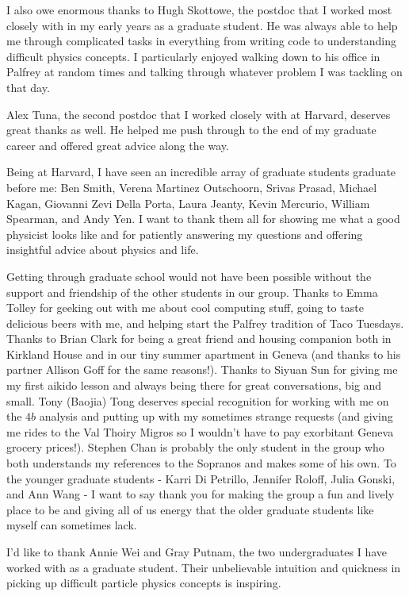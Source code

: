 \begin{doublespace}
I also owe enormous thanks to Hugh Skottowe, the postdoc that I worked most closely with in my early years as a graduate student. He was always able to help me through complicated tasks in everything from writing code to understanding difficult physics concepts. I particularly enjoyed walking down to his office in Palfrey at random times and talking through whatever problem I was tackling on that day. 

Alex Tuna, the second postdoc that I worked closely with at Harvard, deserves great thanks as well. He helped me push through to the end of my graduate career and offered great advice along the way. 

Being at Harvard, I have seen an incredible array of graduate students graduate before me: Ben Smith, Verena Martinez Outschoorn, Srivas Prasad, Michael Kagan, Giovanni Zevi Della Porta, Laura Jeanty, Kevin Mercurio, William Spearman, and Andy Yen. I want to thank them all for showing me what a good physicist looks like and for patiently answering my questions and offering insightful advice about physics and life. 

Getting through graduate school would not have been possible without the support and friendship of the other students in our group. Thanks to Emma Tolley for geeking out with me about cool computing stuff, going to taste delicious beers with me, and helping start the Palfrey tradition of Taco Tuesdays. Thanks to Brian Clark for being a great friend and housing companion both in Kirkland House and in our tiny summer apartment in Geneva (and thanks to his partner Allison Goff for the same reasons!). Thanks to Siyuan Sun for giving me my first aikido lesson and always being there for great conversations, big and small. Tony (Baojia) Tong deserves special recognition for working with me on the $4b$ analysis and putting up with my sometimes strange requests (and giving me rides to the Val Thoiry Migros so I wouldn't have to pay exorbitant Geneva grocery prices!). Stephen Chan is probably the only student in the group who both understands my references to the Sopranos and makes some of his own. To the younger graduate students - Karri Di Petrillo, Jennifer Roloff, Julia Gonski, and Ann Wang - I want to say thank you for making the group a fun and lively place to be and giving all of us energy that the older graduate students like myself can sometimes lack. 

I'd like to thank Annie Wei and Gray Putnam, the two undergraduates I have worked with as a graduate student. Their unbelievable intuition and quickness in picking up difficult particle physics concepts is inspiring. 


\end{doublespace}
